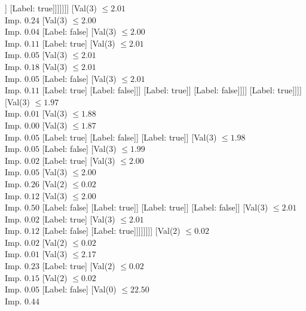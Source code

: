 \documentclass[margin=10pt]{standalone}
\begin{document}
\begin{forest}
													]
												[Label: true]]]]]]]
						[Val($3$) $ \leq 2.01$ \\ Imp. $0.24$
							[Val($3$) $ \leq 2.00$ \\ Imp. $0.04$
								[Label: false]
								[Val($3$) $ \leq 2.00$ \\ Imp. $0.11$
									[Label: true]
									[Val($3$) $ \leq 2.01$ \\ Imp. $0.05$
										[Val($3$) $ \leq 2.01$ \\ Imp. $0.18$
											[Val($3$) $ \leq 2.01$ \\ Imp. $0.05$
												[Label: false]
												[Val($3$) $ \leq 2.01$ \\ Imp. $0.11$
													[Label: true]
													[Label: false]]]
											[Label: true]]
										[Label: false]]]]
							[Label: true]]]]
				[Val($3$) $ \leq 1.97$ \\ Imp. $0.01$
					[Val($3$) $ \leq 1.88$ \\ Imp. $0.00$
						[Val($3$) $ \leq 1.87$ \\ Imp. $0.05$
							[Label: true]
							[Label: false]]
						[Label: true]]
					[Val($3$) $ \leq 1.98$ \\ Imp. $0.05$
						[Label: false]
						[Val($3$) $ \leq 1.99$ \\ Imp. $0.02$
							[Label: true]
							[Val($3$) $ \leq 2.00$ \\ Imp. $0.05$
								[Val($3$) $ \leq 2.00$ \\ Imp. $0.26$
									[Val($2$) $ \leq 0.02$ \\ Imp. $0.12$
										[Val($3$) $ \leq 2.00$ \\ Imp. $0.50$
											[Label: false]
											[Label: true]]
										[Label: true]]
									[Label: false]]
								[Val($3$) $ \leq 2.01$ \\ Imp. $0.02$
									[Label: true]
									[Val($3$) $ \leq 2.01$ \\ Imp. $0.12$
										[Label: false]
										[Label: true]]]]]]]]
			[Val($2$) $ \leq 0.02$ \\ Imp. $0.02$
				[Val($2$) $ \leq 0.02$ \\ Imp. $0.01$
					[Val($3$) $ \leq 2.17$ \\ Imp. $0.23$
						[Label: true]
						[Val($2$) $ \leq 0.02$ \\ Imp. $0.15$
							[Val($2$) $ \leq 0.02$ \\ Imp. $0.05$
								[Label: false]
								[Val($0$) $ \leq 22.50$ \\ Imp. $0.44$

\end{forest}
\end{document}
